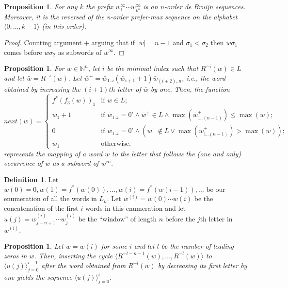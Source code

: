 \documentclass{article}
\newtheorem{proposition}[theorem]{Proposition}
\theoremstyle{definition}
\newtheorem{definition}[theorem]{Definition}
\newcommand{\N}{{\mathbb{N}}}
\newcommand{\T}[1]{\langle{#1}\rangle}
\newcommand{\rl}[2]{R^{-{#2}}({#1})}
\begin{document}
\begin{proposition}
	For any $k$ the prefix $w^\infty_1 \cdots w^\infty_{k^n}$ is an $n$-order de Bruijn sequences. Moreover, it is the reversed of the n-order prefer-max sequence on the alphabet $\T{0,\dots,k-1}$ (in this order). 
\end{proposition}
\begin{proof}
	Counting argument + arguing that if $|w| =n-1$ and $\sigma_1 < \sigma_2$ then $w\sigma_1$ comes before $w\sigma_2$ as subwords of $w^\infty$.
\end{proof}


\begin{proposition}
For $w \in \N^n$, let $i$ be the minimal index such that $\rl{w}{i} \in L$ and let $\bar{w}=\rl{w}{i}$. Let $\bar{w}^+=\bar{w}_{1..i}(\bar{w}_{i+1}+1)\bar{w}_{(i+2)..n}$, i.e., the word obtained by increasing the $(i+1)th$ letter of $\bar{w}$ by one.  Then, the function
$$next(w)=
\begin{cases}
f^*(f_3(w))_1 & \text{if } w \in L; \\
w_1+1         & \text{if }\bar{w}_{1..i}= 0^i \wedge \bar{w}^+ \in L\wedge \max{(\bar{w}^+_{1..(n-1)})} \leq \max(w); \\
0             & \text{if }\bar{w}_{1..i}= 0^i \wedge (\bar{w}^+ \notin L \vee \max{(\bar{w}^+_{1..(n-1)})} > \max(w)); \\
w_1           & \text{otherwise.}
\end{cases}$$
represents the mapping of a word $w$ to the letter that follows the (one and only) occurrence of $w$ as a subword of $w^\infty$.
\end{proposition}

\begin{definition}
	Let $w(0)=0, w(1)=f^*(w(0)),\dots,w(i)=f^*(w{(i-1)}),\dots$ be our enumeration of all the words in $L_n$. Let $w^{(i)}=w(0)\cdots w(i)$ be the concatenation of the first $i$ words in this enumeration and let $u(j)=w^{(i)}_{j-n+1}\cdots w^{(i)}_j$ be the ``window'' of length $n$ before the $j$th letter in $w^{(i)}$.
\end{definition}

\begin{proposition}
	Let $w=w(i)$ for some $i$ and let $l$ be the number of leading zeros in $w$.
	Then, inserting the cycle $\T{R^{-l-n-1}(w),\dots,R^{-l}(w)}$ to $\T{u(j)}_{j=0}^{i-1}$
	after the word obtained from $R^{-l}(w)$ by decreasing its first letter by one
	yields the sequence $\T{u(j)}_{j=0}^{i}$.
\end{proposition}	
\end{document}
